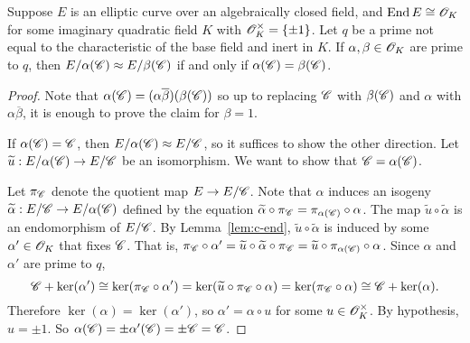 \documentclass{amsart}
\begin{document}
\begin{lemma}\label{lem:c-subgps-distinct-quotients}
  Suppose $E$ is an elliptic curve over an algebraically closed field, and $\operatorname{End} E \cong \mathscr{O}_K$ for some imaginary quadratic field $K$ with $\mathscr{O}_K^\times = \{\pm 1\}$. Let $q$ be a prime not equal to the characteristic of the base field and inert in $K$. If $\alpha,\beta \in \mathscr{O}_K$ are prime to $q$, then $E/\alpha(\mathscr{C}) \approx E/\beta(\mathscr{C})$ if and only if $\alpha(\mathscr{C}) = \beta(\mathscr{C})$.
\end{lemma}
\begin{proof}
  Note that $\alpha(\mathscr{C}) = (\alpha\overline{\beta})(\beta(\mathscr{C}))$ so up to replacing $\mathscr{C}$ with $\beta(\mathscr{C})$ and $\alpha$ with $\alpha\overline{\beta}$, it is enough to prove the claim for $\beta = 1$.

  If $\alpha(\mathscr{C}) = \mathscr{C}$, then $E/\alpha(\mathscr{C}) \approx E/\mathscr{C}$, so it suffices to show the other direction. Let $\widetilde{u}: E/\alpha(\mathscr{C}) \to E/\mathscr{C}$ be an isomorphism. We want to show that $\mathscr{C} = \alpha(\mathscr{C})$.

  Let $\pi_{\mathscr{C}}$ denote the quotient map $E \to E/\mathscr{C}$. Note that $\alpha$ induces an isogeny $\widetilde{\alpha}: E/\mathscr{C} \to E/\alpha(\mathscr{C})$ defined by the equation $\widetilde{\alpha}\circ\pi_{\mathscr{C}} = \pi_{\alpha(\mathscr{C})} \circ \alpha$. The map $\tilde{u}\circ\tilde{\alpha}$ is an endomorphism of $E/\mathscr{C}$. By Lemma~\ref{lem:c-end}, $\tilde{u}\circ\tilde{\alpha}$ is induced by some $\alpha' \in \mathscr{O}_K$ that fixes $\mathscr{C}$. That is, $\pi_{\mathscr{C}}\circ\alpha' = \widetilde{u}\circ\widetilde{\alpha}\circ\pi_{\mathscr{C}} = \widetilde{u}\circ\pi_{\alpha(\mathscr{C})}\circ\alpha$.
  Since $\alpha$ and $\alpha'$ are prime to $q$,
  \[
    \mathscr{C} + \ker(\alpha')
    \cong
    \ker(\pi_{\mathscr{C}} \circ \alpha')
    =
    \ker(\widetilde{u}\circ\pi_{\mathscr{C}}\circ\alpha)
    =
    \ker(\pi_{\mathscr{C}}\circ\alpha)
    \cong
    \mathscr{C} + \ker(\alpha).
  \]
  Therefore $\ker(\alpha) = \ker(\alpha')$, so $\alpha' = \alpha\circ u$ for some $u \in \mathscr{O}_K^\times$. By hypothesis, $u = \pm 1$. So $\alpha(\mathscr{C}) = \pm\alpha'(\mathscr{C}) = \pm\mathscr{C} = \mathscr{C}$.

\end{proof}
\end{document}
